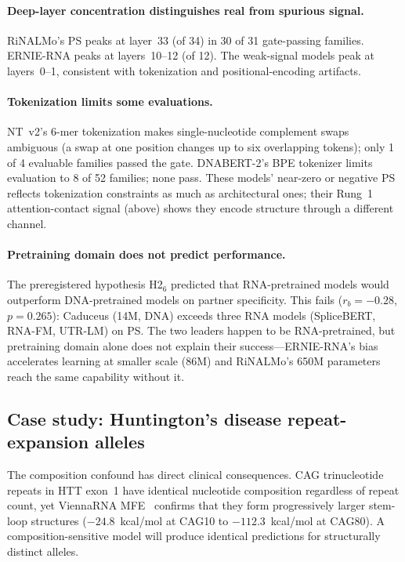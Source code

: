 \documentclass[11pt]{article}
\begin{document}
\paragraph{Deep-layer concentration distinguishes real from spurious signal.}
RiNALMo's PS peaks at layer~33 (of 34) in 30 of 31 gate-passing
families. ERNIE-RNA peaks at layers~10--12 (of 12). The weak-signal
models peak at layers~0--1, consistent with tokenization and
positional-encoding artifacts.

\paragraph{Tokenization limits some evaluations.}
NT~v2's 6-mer tokenization makes single-nucleotide complement swaps
ambiguous (a swap at one position changes up to six overlapping
tokens); only 1 of 4 evaluable families passed the gate. DNABERT-2's
BPE tokenizer limits evaluation to 8 of 52 families; none pass. These
models' near-zero or negative PS reflects tokenization constraints as
much as architectural ones; their Rung~1 attention-contact signal
(above) shows they encode structure through a different channel.

\paragraph{Pretraining domain does not predict performance.}
The preregistered hypothesis H2$_6$ predicted that RNA-pretrained
models would outperform DNA-pretrained models on partner specificity.
This fails ($r_b = -0.28$, $p = 0.265$): Caduceus (14M, DNA) exceeds
three RNA models (SpliceBERT, RNA-FM, UTR-LM) on PS. The two leaders
happen to be RNA-pretrained, but pretraining domain alone does not
explain their success---ERNIE-RNA's bias accelerates learning at
smaller scale (86M) and RiNALMo's 650M parameters reach the same
capability without it.

\subsection{Case study: Huntington's disease repeat-expansion alleles}

The composition confound has direct clinical consequences. CAG
trinucleotide repeats in HTT exon~1 have identical nucleotide
composition regardless of repeat count, yet ViennaRNA
MFE~\citep{vienna2011} confirms that they form progressively larger
stem-loop structures ($-24.8$~kcal/mol at CAG10 to
$-112.3$~kcal/mol at CAG80). A composition-sensitive model will
produce identical predictions for structurally distinct alleles.
\end{document}
